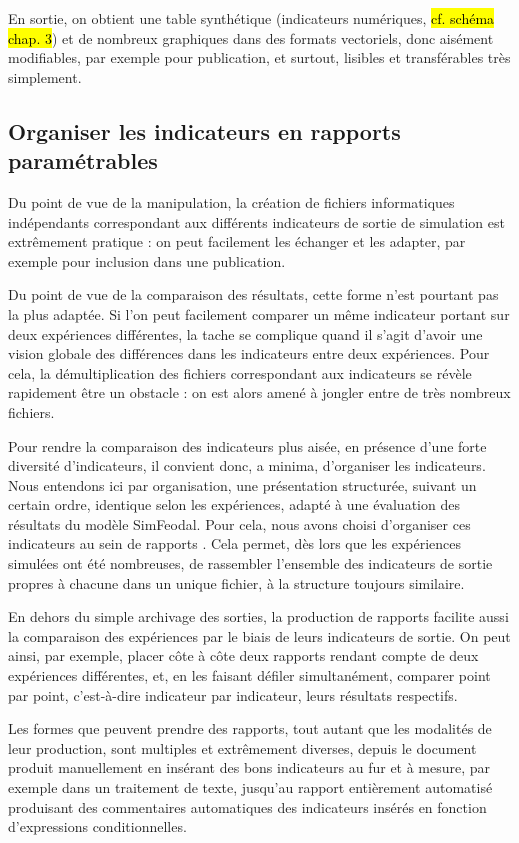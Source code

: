 	En sortie, on obtient une table synthétique (indicateurs numériques, \hl{cf. schéma chap. 3}) et de nombreux graphiques dans des formats vectoriels, donc aisément modifiables, par exemple pour publication, et surtout, lisibles et transférables très simplement.

	\subsection{Organiser les indicateurs en rapports paramétrables}

	Du point de vue de la manipulation, la création de fichiers informatiques indépendants correspondant aux différents indicateurs de sortie de simulation est extrêmement pratique : on peut facilement les échanger et les adapter, par exemple pour inclusion dans une publication.

	Du point de vue de la comparaison des résultats, cette forme n'est pourtant pas la plus adaptée.
	Si l'on peut facilement comparer un même indicateur portant sur deux expériences différentes, la tache se complique quand il s'agit d'avoir une vision globale des différences dans les indicateurs entre deux expériences.
	Pour cela, la démultiplication des fichiers correspondant aux indicateurs se révèle rapidement être un obstacle : on est alors amené à jongler entre de très nombreux fichiers.

	Pour rendre la comparaison des indicateurs plus aisée, en présence d'une forte diversité d'indicateurs, il convient donc, a minima, d'organiser les indicateurs.
	Nous entendons ici par organisation, une présentation structurée, suivant un certain ordre, identique selon les expériences, adapté à une évaluation des résultats du modèle SimFeodal.
	Pour cela, nous avons choisi d'organiser ces \og indicateurs\fg{} au sein de \og rapports \fg{}.
	Cela permet, dès lors que les expériences simulées ont été nombreuses, de rassembler l'ensemble des indicateurs de sortie propres à chacune dans un unique fichier, à la structure toujours similaire.

	En dehors du simple archivage des sorties, la production de rapports facilite aussi la comparaison des expériences par le biais de leurs indicateurs de sortie.
	On peut ainsi, par exemple, placer côte à côte deux rapports rendant compte de deux expériences différentes, et, en les faisant défiler simultanément, comparer point par point, c'est-à-dire indicateur par indicateur, leurs résultats respectifs.

	Les formes que peuvent prendre des rapports, tout autant que les modalités de leur production, sont multiples et extrêmement diverses, depuis le document produit manuellement en insérant des bons indicateurs au fur et à mesure, par exemple dans un traitement de texte, jusqu'au rapport entièrement automatisé produisant des commentaires automatiques des indicateurs insérés en fonction d'expressions conditionnelles.

